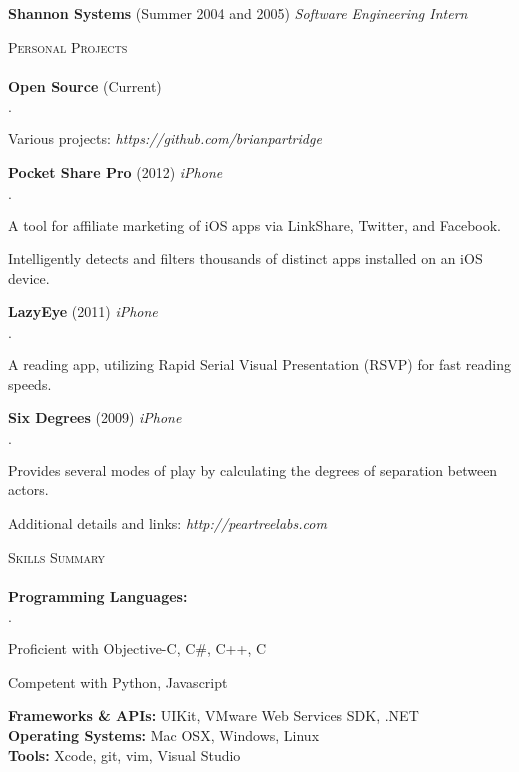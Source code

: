 \documentclass[11pt]{article}
\newcommand{\mydot}{$\cdot$ }
\newcommand{\lineunder}{\vspace*{-8pt} \\ \hspace*{-18pt} \hrulefill \\}
\newcommand{\header}[1]{{\hspace*{-15pt}\vspace*{6pt} \textsc{#1}} \vspace*{-6pt} \lineunder}
\newcommand{\employer}[3]{\textbf{#1} (#2) \emph{#3}\\  }
\newcommand{\project}[3]{\textbf{#1} (#2) \emph{#3}\\  }
\newenvironment{achievements}{\begin{list}{\mydot}{\topsep 0pt \itemsep -2pt}}{\vspace*{4pt}\end{list}}
\begin{document}
\employer{Shannon Systems}{Summer 2004 and 2005}{Software Engineering Intern}
\vspace*{14pt}
  

\header{Personal Projects}
  \project{Open Source}{Current}{}{
  \begin{achievements}
    \item Various projects: \emph{https://github.com/brianpartridge}
  \end{achievements}}
\project{Pocket Share Pro}{2012}{iPhone}{
\begin{achievements}
  \item A tool for affiliate marketing of iOS apps via LinkShare, Twitter, and Facebook.
  \item Intelligently detects and filters thousands of distinct apps installed on an iOS device.
\end{achievements}}  
\project{LazyEye}{2011}{iPhone}{
\begin{achievements}
  \item A reading app, utilizing Rapid Serial Visual Presentation (RSVP) for fast reading speeds.
\end{achievements}}
\project{Six Degrees}{2009}{iPhone}{
\begin{achievements}
  \item Provides several modes of play by calculating the degrees of separation between actors.
\end{achievements}}
Additional details and links: \emph{http://peartreelabs.com}\\  
\vspace*{14pt}
  

\header{Skills Summary}
\textbf{Programming Languages:} 
\begin{achievements}
  \item Proficient with Objective-C, C\#, C++, C
  \item Competent with Python, Javascript
\end{achievements}
\vspace{-3pt}

\textbf{Frameworks \& APIs:} UIKit, VMware Web Services SDK, .NET\\

\textbf{Operating Systems:} Mac OSX, Windows, Linux\\

\textbf{Tools:} Xcode, git, vim, Visual Studio\\
\end{document}
